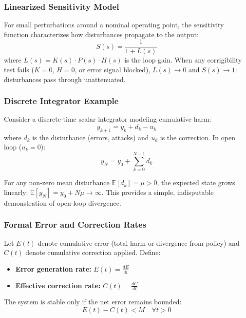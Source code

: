 \documentclass{article}
\begin{document}
\subsubsection{Linearized Sensitivity Model}

For small perturbations around a nominal operating point, the sensitivity function characterizes how disturbances propagate to the output:
\begin{equation}
S(s) = \frac{1}{1 + L(s)}
\end{equation}
where $L(s) = K(s) \cdot P(s) \cdot H(s)$ is the loop gain. When any corrigibility test fails ($K=0$, $H=0$, or error signal blocked), $L(s) \to 0$ and $S(s) \to 1$: disturbances pass through unattenuated.

\subsubsection{Discrete Integrator Example}

Consider a discrete-time scalar integrator modeling cumulative harm:
\begin{equation}
y_{k+1} = y_k + d_k - u_k
\end{equation}
where $d_k$ is the disturbance (errors, attacks) and $u_k$ is the correction. In open loop ($u_k = 0$):
\begin{equation}
y_N = y_0 + \sum_{k=0}^{N-1} d_k
\end{equation}

For any non-zero mean disturbance $\mathbb{E}[d_k] = \mu > 0$, the expected state grows linearly: $\mathbb{E}[y_N] = y_0 + N\mu \to \infty$. This provides a simple, indisputable demonstration of open-loop divergence.

\subsubsection{Formal Error and Correction Rates}

Let $E(t)$ denote cumulative error (total harm or divergence from policy) and $C(t)$ denote cumulative correction applied. Define:
\begin{itemize}
    \item \textbf{Error generation rate:} $\dot{E}(t) = \frac{dE}{dt}$
    \item \textbf{Effective correction rate:} $\dot{C}(t) = \frac{dC}{dt}$
\end{itemize}

The system is stable only if the net error remains bounded:
\begin{equation}
E(t) - C(t) < M \quad \forall t > 0
\end{equation}
\end{document}
